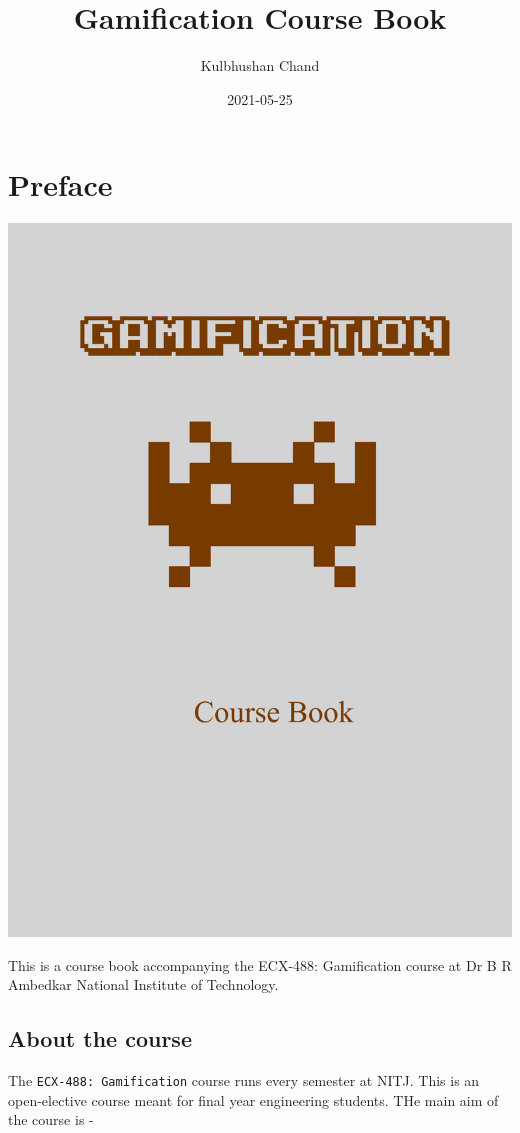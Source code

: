 \documentclass[
]{book}
\title{Gamification Course Book}
\author{Kulbhushan Chand}
\date{2021-05-25}
\begin{document}
\maketitle

{
\setcounter{tocdepth}{1}
\tableofcontents
}
\hypertarget{preface}{%
\chapter*{Preface}\label{preface}}

\begin{center}\includegraphics[width=0.75\linewidth]{assets/images/book-cover} \end{center}

This is a course book accompanying the ECX-488: Gamification course at Dr B R Ambedkar National Institute of Technology.

\hypertarget{course}{%
\section*{About the course}\label{course}}

The \texttt{ECX-488:\ Gamification} course runs every semester at NITJ. This is an open-elective course meant for final year engineering students. THe main aim of the course is -
\end{document}
